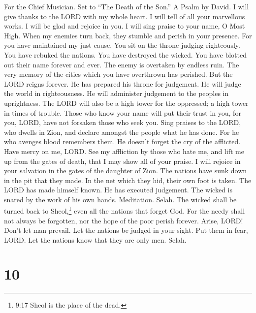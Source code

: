 For the Chief Musician. Set to ``The Death of the Son.'' A Psalm by
David.  I will give thanks to the LORD with my whole heart.
I will tell of all your marvellous works.  I will be glad
and rejoice in you. I will sing praise to your name, O Most High.
 When my enemies turn back, they stumble and perish in your
presence.  For you have maintained my just cause. You sit on
the throne judging righteously.  You have rebuked the
nations. You have destroyed the wicked. You have blotted out their name
forever and ever.  The enemy is overtaken by endless ruin.
The very memory of the cities which you have overthrown has perished.
 But the LORD reigns forever. He has prepared his throne for
judgement.  He will judge the world in righteousness. He
will administer judgement to the peoples in uprightness. 
The LORD will also be a high tower for the oppressed; a high tower in
times of trouble.  Those who know your name will put their
trust in you, for you, LORD, have not forsaken those who seek you.
 Sing praises to the LORD, who dwells in Zion, and declare
amongst the people what he has done.  For he who avenges
blood remembers them. He doesn't forget the cry of the afflicted.
 Have mercy on me, LORD. See my affliction by those who
hate me, and lift me up from the gates of death,  that I
may show all of your praise. I will rejoice in your salvation in the
gates of the daughter of Zion.  The nations have sunk down
in the pit that they made. In the net which they hid, their own foot is
taken.  The LORD has made himself known. He has executed
judgement. The wicked is snared by the work of his own hands.
Meditation. Selah.  The wicked shall be turned back to
Sheol,\footnote{9:17 Sheol is the place of the dead.} even all the
nations that forget God.  For the needy shall not always be
forgotten, nor the hope of the poor perish forever.  Arise,
LORD! Don't let man prevail. Let the nations be judged in your sight.
 Put them in fear, LORD. Let the nations know that they are
only men. Selah.

\hypertarget{section-9}{%
\section{10}\label{section-9}}

